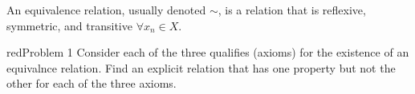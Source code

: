 \documentclass[12pt,oneside]{report}
\begin{document}
\begin{definition}
  An equivalence relation, usually denoted \( \sim  \), is a relation that is reflexive, symmetric, and transitive \( \forall x_n \in X \).
\end{definition}

\begin{mybox}{red}{Problem 1}
  Consider each of the three qualifies (axioms) for the existence of an equivalnce relation. Find an explicit relation that has one property but not the other for each of the three axioms.
\end{mybox}
\end{document}
